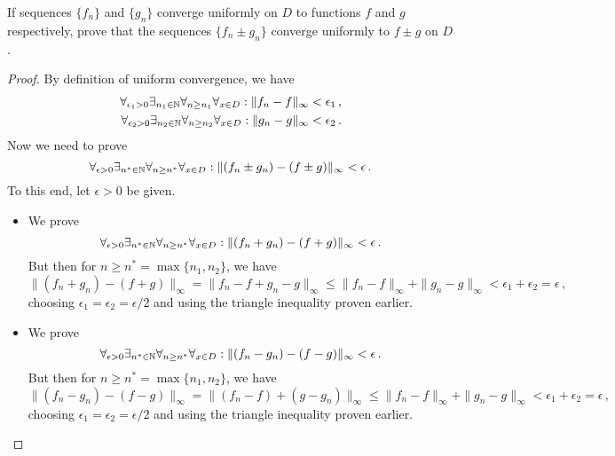 \documentclass[week=10]{homework}
\begin{document}
\begin{questions}
		\question
		\begin{inlinetoprove}
			If sequences $\{f_n \}$ and $\{g_n \}$ converge uniformly on $D$ to functions $f$ and $g$ respectively, prove that the sequences $\{f_n \pm g_n \}$ converge uniformly to $f \pm g$ on $D$.
		\end{inlinetoprove}
		\begin{proof}
			By definition of uniform convergence, we have
			\begin{align*}
				\forall_{\epsilon_1 > 0}\exists_{n_1 \in \naturals}\forall_{n \geq n_1}\forall_{x\in D}: \|f_n - f\|_\infty &< \epsilon_1\,, \\
				\forall_{\epsilon_2 > 0}\exists_{n_2 \in \naturals}\forall_{n \geq n_2}\forall_{x\in D}: \|g_n - g\|_\infty &< \epsilon_2\,.
			\end{align*}
			Now we need to prove
			\[
				\forall_{\epsilon > 0}\exists_{n^* \in \naturals}\forall_{n \geq n^*}\forall_{x\in D}: \|(f_n \pm g_n) - (f \pm g)\|_\infty < \epsilon\,.
			\]
			To this end, let $\epsilon > 0$ be given.
			\begin{itemize}
				\item We prove
				\[
				\forall_{\epsilon > 0}\exists_{n^* \in \naturals}\forall_{n \geq n^*}\forall_{x\in D}: \|(f_n + g_n) - (f + g)\|_\infty < \epsilon\,.
				\]
				But then for $n \geq n^* = \max\{n_1,n_2\}$, we have
				\[
					\|(f_n + g_n) - (f + g)\|_\infty = \|f_n - f + g_n - g\|_\infty \leq \| f_n - f\|_\infty + \| g_n - g \|_\infty < \epsilon_1 + \epsilon_2 = \epsilon\,,
				\]
				choosing $\epsilon_1 = \epsilon_2 = \epsilon/2$ and using the triangle inequality proven earlier.
				
				\item We prove
				\[
				\forall_{\epsilon > 0}\exists_{n^* \in \naturals}\forall_{n \geq n^*}\forall_{x\in D}: \|(f_n - g_n) - (f - g)\|_\infty < \epsilon\,.
				\]
				But then for $n \geq n^* = \max\{n_1,n_2\}$, we have
				\[
				\|(f_n - g_n) - (f - g)\|_\infty = \|(f_n - f )+ (g - g_n)\|_\infty \leq \| f_n - f\|_\infty + \| g_n - g \|_\infty < \epsilon_1 + \epsilon_2 = \epsilon\,,
				\]
				choosing $\epsilon_1 = \epsilon_2 = \epsilon/2$ and using the triangle inequality proven earlier.
			\end{itemize}
		\end{proof}
     \end{questions}
\end{document}
